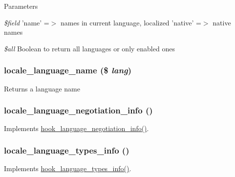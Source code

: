 \begin{DoxyParams}{Parameters}
\item[{\em \$field}]'name' =$>$ names in current language, localized 'native' =$>$ native names \item[{\em \$all}]Boolean to return all languages or only enabled ones \end{DoxyParams}
\hypertarget{locale_8module_a1446648d967a237f9476798d8a136a7d}{
\subsubsection[{locale\_\-language\_\-name}]{\setlength{\rightskip}{0pt plus 5cm}locale\_\-language\_\-name (\$ {\em lang})}}
\label{locale_8module_a1446648d967a237f9476798d8a136a7d}
Returns a language name \hypertarget{locale_8module_a466ecb6aa7c40e3d5811baf3ab50f17b}{
\subsubsection[{locale\_\-language\_\-negotiation\_\-info}]{\setlength{\rightskip}{0pt plus 5cm}locale\_\-language\_\-negotiation\_\-info ()}}
\label{locale_8module_a466ecb6aa7c40e3d5811baf3ab50f17b}
Implements \hyperlink{group__language__negotiation_gabcac4b239272ba30c6320a0af2fab46e}{hook\_\-language\_\-negotiation\_\-info()}. \hypertarget{locale_8module_a8a6568505c70074277a041adbdd8f5f0}{
\subsubsection[{locale\_\-language\_\-types\_\-info}]{\setlength{\rightskip}{0pt plus 5cm}locale\_\-language\_\-types\_\-info ()}}
\label{locale_8module_a8a6568505c70074277a041adbdd8f5f0}
Implements \hyperlink{group__language__negotiation_ga8932d2167557c18966cd033cfbe0f37e}{hook\_\-language\_\-types\_\-info()}.


